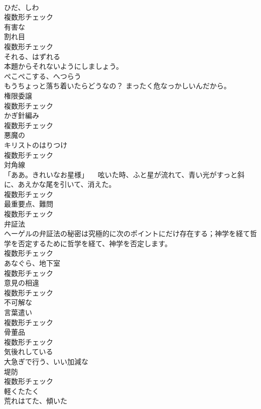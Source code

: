 \documentclass[8pt]{extreport}
\begin{document}
\begin{CJK}{UTF8}{min}
\\	[名詞]	ひだ、しわ	
\\	複数形チェック
\\	[形容詞]	有害な	
\\	[名詞]	割れ目	
\\	複数形チェック
\\	[動詞]	それる、はずれる	
\\	本題からそれないようにしましょう。	
\\	[動詞]	ぺこぺこする、へつらう	
\\	もうちょっと落ち着いたらどうなの？ まったく危なっかしいんだから。	
\\	[名詞]	権限委譲	
\\	複数形チェック
\\	[名詞]	かぎ針編み	
\\	複数形チェック
\\	[形容詞]	悪魔の	
\\	[名詞]	キリストのはりつけ	
\\	複数形チェック
\\	[名詞]	対角線	
\\	「ああ。きれいなお星様」 　呟いた時、ふと星が流れて、青い光がすっと斜に、あえかな尾を引いて、消えた。	
\\	複数形チェック
\\	[名詞]	最重要点、難問	
\\	複数形チェック
\\	[名詞]	弁証法	
\\	ヘーゲルの弁証法の秘密は究極的に次のポイントにだけ存在する；神学を経て哲学を否定するために哲学を経て、神学を否定します。	
\\	複数形チェック
\\	[名詞]	あなぐら、地下室	
\\	複数形チェック
\\	[名詞]	意見の相違	
\\	複数形チェック
\\	[形容詞]	不可解な	
\\	[名詞]	言葉遣い	
\\	複数形チェック
\\	[名詞]	骨董品	
\\	複数形チェック
\\	[形容詞]	気後れしている	
\\	[形容詞]	大急ぎで行う、いい加減な	
\\	[名詞]	堤防	
\\	複数形チェック
\\	[動詞]	軽くたたく	
\\	[形容詞]	荒れはてた、傾いた	

\end{CJK}
\end{document}
